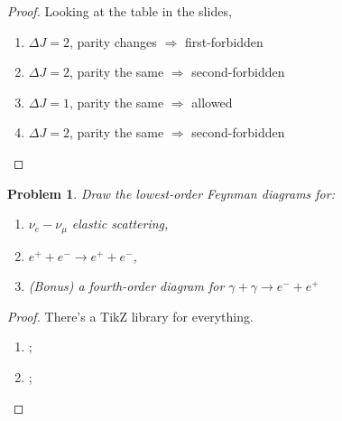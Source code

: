 \documentclass{article}
\newtheorem{plm}{Problem}
\begin{document}
\begin{proof}
  Looking at the table in the slides,
  \begin{enumerate}
  \item $\Delta J = 2$, parity changes $\Rightarrow$ first-forbidden
  \item $\Delta J = 2$, parity the same $\Rightarrow$ second-forbidden
  \item $\Delta J = 1$, parity the same $\Rightarrow$ allowed
  \item $\Delta J = 2$, parity the same $\Rightarrow$ second-forbidden
  \end{enumerate}
\end{proof}

\begin{plm}
  Draw the lowest-order Feynman diagrams for:
  \begin{enumerate}
  \item $\nu_{e}-\nu_{\mu}$ elastic scattering,
  \item $e^{+} + e^{-} \to e^{+} + e^{-}$,
  \item (Bonus) a fourth-order diagram for $\gamma + \gamma \to e^{-} + e^{+}$
  \end{enumerate}
\end{plm}

\begin{proof}
  There's a TikZ library for everything.
  \begin{enumerate}
  \item
    ;

  \item {};
  \end{enumerate}
\end{proof}
\end{document}
